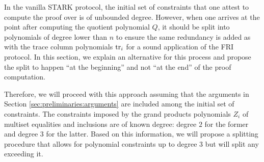 In the vanilla STARK protocol, the initial set of constraints that one attest to compute the proof over is of unbounded degree. However, when one arrives at the point after computing the quotient polynomial $Q$, it should be split into polynomials of degree lower than $n$ to ensure the same redundancy is added as with the trace column polynomials $\text{tr}_i$ for a sound application of the FRI protocol. In this section, we explain an alternative for this process and propose the split to happen ``at the beginning'' and not ``at the end'' of the proof computation. 

Therefore, we will proceed with this approach assuming that the arguments in Section \ref{sec:preliminaries:arguments} are included among the initial set of constraints. The constraints imposed by the grand products polynomials $Z_i$ of multiset equalities and inclusions are of known degree: degree $2$ for the former and degree $3$ for the latter. Based on this information, we will propose a splitting procedure that allows for polynomial constraints up to degree $3$ but will split any exceeding it.

